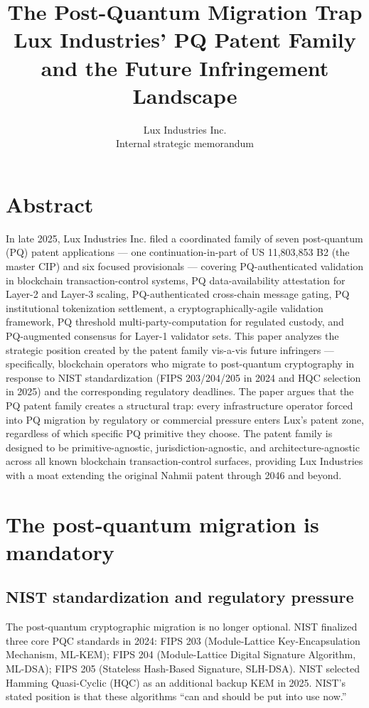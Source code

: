 \documentclass[11pt,letterpaper]{article}
\title{\textbf{The Post-Quantum Migration Trap}\\[6pt]
\large Lux Industries' PQ Patent Family and the Future Infringement Landscape}
\author{Lux Industries Inc.\\[2pt]\small Internal strategic memorandum}
\date{}
\begin{document}
\luxcoverpage
\maketitle

\section*{Abstract}

In late 2025, Lux Industries Inc. filed a coordinated family of seven post-quantum (PQ) patent applications --- one continuation-in-part of US 11,803,853 B2 (the master CIP) and six focused provisionals --- covering PQ-authenticated validation in blockchain transaction-control systems, PQ data-availability attestation for Layer-2 and Layer-3 scaling, PQ-authenticated cross-chain message gating, PQ institutional tokenization settlement, a cryptographically-agile validation framework, PQ threshold multi-party-computation for regulated custody, and PQ-augmented consensus for Layer-1 validator sets. This paper analyzes the strategic position created by the patent family vis-a-vis future infringers --- specifically, blockchain operators who migrate to post-quantum cryptography in response to NIST standardization (FIPS 203/204/205 in 2024 and HQC selection in 2025) and the corresponding regulatory deadlines. The paper argues that the PQ patent family creates a structural trap: every infrastructure operator forced into PQ migration by regulatory or commercial pressure enters Lux's patent zone, regardless of which specific PQ primitive they choose. The patent family is designed to be primitive-agnostic, jurisdiction-agnostic, and architecture-agnostic across all known blockchain transaction-control surfaces, providing Lux Industries with a moat extending the original Nahmii patent through 2046 and beyond.

\section{The post-quantum migration is mandatory}

\subsection{NIST standardization and regulatory pressure}

The post-quantum cryptographic migration is no longer optional. NIST finalized three core PQC standards in 2024: FIPS 203 (Module-Lattice Key-Encapsulation Mechanism, ML-KEM); FIPS 204 (Module-Lattice Digital Signature Algorithm, ML-DSA); FIPS 205 (Stateless Hash-Based Signature, SLH-DSA). NIST selected Hamming Quasi-Cyclic (HQC) as an additional backup KEM in 2025. NIST's stated position is that these algorithms ``can and should be put into use now.''
\end{document}
